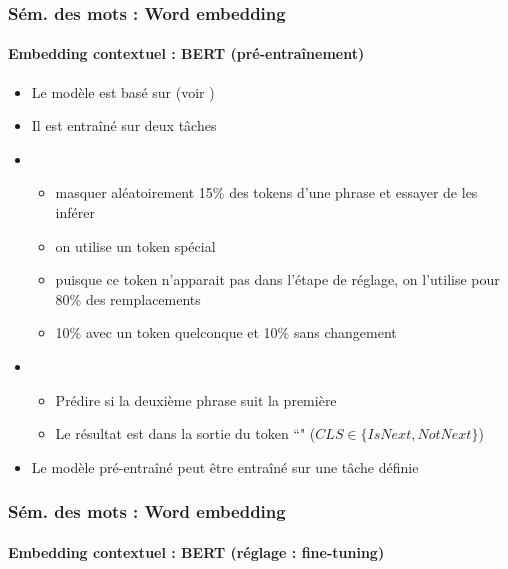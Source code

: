 \documentclass[xcolor=table]{beamer}
\begin{document}
\begin{frame}
\frametitle{Sém. des mots : Word embedding}
\framesubtitle{Embedding contextuel : BERT (pré-entraînement)}
	
\begin{itemize}
	\item Le modèle est basé sur  (voir \cite{2017-vaswani-al})
	\item Il est entraîné sur deux tâches
	\item {}
	\begin{itemize}
		\item masquer aléatoirement 15\% des tokens d'une phrase et essayer de les inférer
		\item on utilise un token spécial \keyword{[MASK]}
		\item puisque ce token n'apparait pas dans l'étape de réglage, on l'utilise pour 80\% des remplacements
		\item 10\% avec un token quelconque et 10\% sans changement 
	\end{itemize}
	\item {}
	\begin{itemize}
		\item Prédire si la deuxième phrase suit la première 
		\item Le résultat est dans la sortie du token ``\keyword{[CLS]}" ($CLS \in \{IsNext, NotNext\}$)
	\end{itemize}
	\item Le modèle pré-entraîné peut être entraîné sur une tâche définie
\end{itemize}
	
\end{frame}

\begin{frame}
\frametitle{Sém. des mots : Word embedding}
\framesubtitle{Embedding contextuel : BERT (réglage : fine-tuning)}

	\begin{center}
	\end{center}
	
\end{frame}
\end{document}
